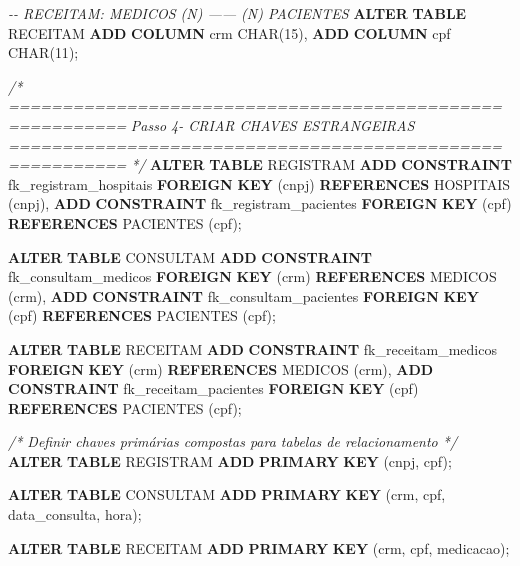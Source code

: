 \documentclass[
]{book}
\newenvironment{Shaded}{\begin{snugshade}}{\end{snugshade}}
\newcommand{\CommentTok}[1]{\textcolor[rgb]{0.56,0.35,0.01}{\textit{#1}}}
\newcommand{\DataTypeTok}[1]{\textcolor[rgb]{0.13,0.29,0.53}{#1}}
\newcommand{\DecValTok}[1]{\textcolor[rgb]{0.00,0.00,0.81}{#1}}
\newcommand{\KeywordTok}[1]{\textcolor[rgb]{0.13,0.29,0.53}{\textbf{#1}}}
\newcommand{\NormalTok}[1]{#1}
\begin{document}
\begin{Shaded}
\begin{Highlighting}[]
\CommentTok{{-}{-} RECEITAM: MEDICOS (N) —— (N) PACIENTES}
\KeywordTok{ALTER} \KeywordTok{TABLE}\NormalTok{ RECEITAM  }\KeywordTok{ADD} \KeywordTok{COLUMN}\NormalTok{ crm  }\DataTypeTok{CHAR}\NormalTok{(}\DecValTok{15}\NormalTok{), }\KeywordTok{ADD} \KeywordTok{COLUMN}\NormalTok{ cpf  }\DataTypeTok{CHAR}\NormalTok{(}\DecValTok{11}\NormalTok{);}

\CommentTok{/* =========================================================}
\CommentTok{   Passo 4{-} CRIAR CHAVES ESTRANGEIRAS}
\CommentTok{   ========================================================= */}
\KeywordTok{ALTER} \KeywordTok{TABLE}\NormalTok{ REGISTRAM}
    \KeywordTok{ADD} \KeywordTok{CONSTRAINT}\NormalTok{ fk\_registram\_hospitais}
        \KeywordTok{FOREIGN} \KeywordTok{KEY}\NormalTok{ (cnpj)}
        \KeywordTok{REFERENCES}\NormalTok{ HOSPITAIS (cnpj),}
    \KeywordTok{ADD} \KeywordTok{CONSTRAINT}\NormalTok{ fk\_registram\_pacientes}
        \KeywordTok{FOREIGN} \KeywordTok{KEY}\NormalTok{ (cpf)}
        \KeywordTok{REFERENCES}\NormalTok{ PACIENTES (cpf);}

\KeywordTok{ALTER} \KeywordTok{TABLE}\NormalTok{ CONSULTAM}
    \KeywordTok{ADD} \KeywordTok{CONSTRAINT}\NormalTok{ fk\_consultam\_medicos}
        \KeywordTok{FOREIGN} \KeywordTok{KEY}\NormalTok{ (crm)}
        \KeywordTok{REFERENCES}\NormalTok{ MEDICOS (crm),}
    \KeywordTok{ADD} \KeywordTok{CONSTRAINT}\NormalTok{ fk\_consultam\_pacientes}
        \KeywordTok{FOREIGN} \KeywordTok{KEY}\NormalTok{ (cpf)}
        \KeywordTok{REFERENCES}\NormalTok{ PACIENTES (cpf);}

\KeywordTok{ALTER} \KeywordTok{TABLE}\NormalTok{ RECEITAM}
    \KeywordTok{ADD} \KeywordTok{CONSTRAINT}\NormalTok{ fk\_receitam\_medicos}
        \KeywordTok{FOREIGN} \KeywordTok{KEY}\NormalTok{ (crm)}
        \KeywordTok{REFERENCES}\NormalTok{ MEDICOS (crm),}
    \KeywordTok{ADD} \KeywordTok{CONSTRAINT}\NormalTok{ fk\_receitam\_pacientes}
        \KeywordTok{FOREIGN} \KeywordTok{KEY}\NormalTok{ (cpf)}
        \KeywordTok{REFERENCES}\NormalTok{ PACIENTES (cpf);}

\CommentTok{/* Definir chaves primárias compostas para tabelas de relacionamento */}
\KeywordTok{ALTER} \KeywordTok{TABLE}\NormalTok{ REGISTRAM }\KeywordTok{ADD} \KeywordTok{PRIMARY} \KeywordTok{KEY}\NormalTok{ (cnpj, cpf);}

\KeywordTok{ALTER} \KeywordTok{TABLE}\NormalTok{ CONSULTAM }\KeywordTok{ADD} \KeywordTok{PRIMARY} \KeywordTok{KEY}\NormalTok{ (crm, cpf, data\_consulta, hora);}

\KeywordTok{ALTER} \KeywordTok{TABLE}\NormalTok{ RECEITAM  }\KeywordTok{ADD} \KeywordTok{PRIMARY} \KeywordTok{KEY}\NormalTok{ (crm, cpf, medicacao);}
\end{Highlighting}
\end{Shaded}
\end{document}
